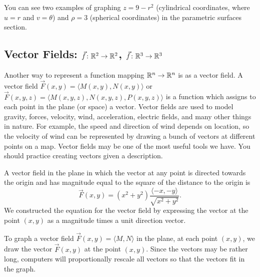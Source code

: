 You can see two examples of graphing $z=9-r^2$ (cylindrical
coordinates, where $u=r$ and $v=\theta$) and $\rho=3$ (spherical
coordinates) in the parametric surfaces section.

\subsection{Vector Fields: {$\vec f\colon \mathbb{R}^2\to \mathbb{R}^2$}, {$\vec f\colon \mathbb{R}^3\to \mathbb{R}^3$}}
Another way to represent a function mapping $\mathbb{R}^n\to\mathbb{R}^n$ is as a
vector field.  A vector field $\vec F(x,y) = \langle
M(x,y),N(x,y)\rangle$ or $\vec F(x,y,z) = \langle
M(x,y,z),N(x,y,z),P(x,y,z) \rangle$ is a function which assigns to
each point in the plane (or space) a vector.  Vector fields are used
to model gravity, forces, velocity, wind, acceleration, electric
fields, and many other things in nature. For example, the speed and
direction of wind depends on location, so the velocity of wind can be
represented by drawing a bunch of vectors at different points on a
map.  Vector fields may be one of the most useful tools we have.  You
should practice creating vectors given a description. 

\begin{example} 
A vector field in the plane in which the vector at any
point is directed towards the origin and has magnitude equal to the
square of the distance to the origin is
$$\vec F(x,y) =
(x^2+y^2)\frac{\langle-x,-y\rangle}{\sqrt{x^2+y^2}}.$$ We constructed
the equation for the vector field by expressing the vector at the
point $(x,y)$ as a magnitude times a unit direction vector.  
\end{example}

To graph a vector field $\vec F(x,y) = \langle M,N\rangle$ in the
plane, at each point $(x,y)$, we draw the vector $\vec F(x,y)$ at the
point $(x,y)$. Since the vectors may be rather long, computers will
proportionally rescale all vectors so that the vectors fit in the
graph.

